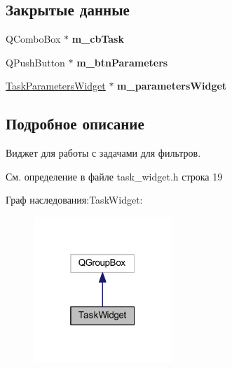 \subsection*{Закрытые данные}
\begin{DoxyCompactItemize}
\item 
\hypertarget{class_task_widget_afbdad5a3494264c0edcd3fc2444bb5bb}{}\label{class_task_widget_afbdad5a3494264c0edcd3fc2444bb5bb} 
Q\+Combo\+Box $\ast$ {\bfseries m\+\_\+cb\+Task}
\item 
\hypertarget{class_task_widget_a150a4b841480dcce86914f04635812ef}{}\label{class_task_widget_a150a4b841480dcce86914f04635812ef} 
Q\+Push\+Button $\ast$ {\bfseries m\+\_\+btn\+Parameters}
\item 
\hypertarget{class_task_widget_a5feaeeed716a49df8022b6b712c69840}{}\label{class_task_widget_a5feaeeed716a49df8022b6b712c69840} 
\hyperlink{class_task_parameters_widget}{Task\+Parameters\+Widget} $\ast$ {\bfseries m\+\_\+parameters\+Widget}
\end{DoxyCompactItemize}


\subsection{Подробное описание}
Виджет для работы с задачами для фильтров. 

См. определение в файле task\+\_\+widget.\+h строка 19



Граф наследования\+:Task\+Widget\+:\nopagebreak
\begin{figure}[H]
\begin{center}
\leavevmode
\includegraphics[width=148pt]{class_task_widget__inherit__graph}
\end{center}
\end{figure}


